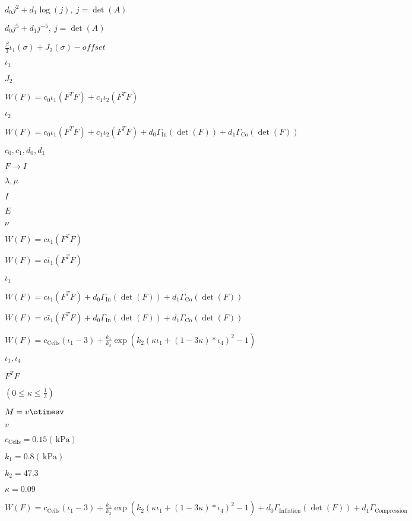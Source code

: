 \documentclass{article}
\begin{document}
$ d_0 j^2 + d_1 \log(j),\ j=\det(A) $
\pagebreak

$ d_0 j^5 + d_1 j^{-5},\ j=\det(A) $
\pagebreak

$ \frac{\beta}{3}\iota_1(\sigma) + J_2(\sigma)-offset $
\pagebreak

$\iota_1$
\pagebreak

$J_2$
\pagebreak

$ W(F)=c_0\iota_1(F^T F) + c_1\iota_2(F^T F) $
\pagebreak

$\iota_2$
\pagebreak

$ W(F)=c_0\iota_1(F^T F) + c_1\iota_2(F^T F) + d_0\Gamma_\mathrm{In}(\det(F))+d_1\Gamma_\mathrm{Co}(\det(F)) $
\pagebreak

$c_0,c_1,d_0,d_1$
\pagebreak

$F\rightarrow I$
\pagebreak

$\lambda,\mu$
\pagebreak

$I$
\pagebreak

$E$
\pagebreak

$\nu$
\pagebreak

$ W(F)=c\iota_1(F^T F) $
\pagebreak

$ W(F)=c\bar\iota_1(F^T F) $
\pagebreak

$\bar\iota_1$
\pagebreak

$ W(F)=c\iota_1(F^T F)+d_0\Gamma_\mathrm{In}(\det(F))+d_1\Gamma_\mathrm{Co}(\det(F)) $
\pagebreak

$ W(F)=c\bar\iota_1(F^T F)+d_0\Gamma_\mathrm{In}(\det(F))+d_1\Gamma_\mathrm{Co}(\det(F)) $
\pagebreak

$ W(F)= c_\mathrm{Cells}(\iota_1-3) + \frac{k_1}{k_2}\exp(k_2(\kappa\iota_1+(1-3\kappa)*\iota_4)^2-1) $
\pagebreak

$ \iota_1,\iota_4 $
\pagebreak

$F^T F$
\pagebreak

$(0\le\kappa\le\frac{1}{3})$
\pagebreak

$M=v\otimesv$
\pagebreak

$v$
\pagebreak

$c_\mathrm{Cells}=0.15 (\,\mathrm{kPa})$
\pagebreak

$k_1=0.8 (\,\mathrm{kPa})$
\pagebreak

$k_2=47.3$
\pagebreak

$\kappa=0.09$
\pagebreak

$ W(F)= c_\mathrm{Cells}(\iota_1-3) + \frac{k_1}{k_2}\exp(k_2(\kappa\iota_1+(1-3\kappa)*\iota_4)^2-1) + d_0\Gamma_\mathrm{Inflation}(\det(F)) + d_1\Gamma_\mathrm{Compression} $
\pagebreak
\end{document}
